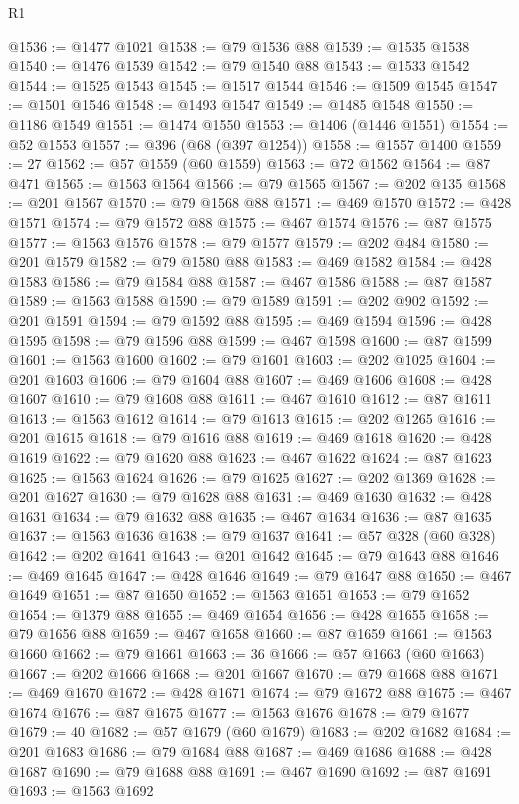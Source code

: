 \begin{lexlean}{R1}
\begin{coremodule}
@1536 := @1477 @1021
@1538 := @79 @1536 @88
@1539 := @1535 @1538
@1540 := @1476 @1539
@1542 := @79 @1540 @88
@1543 := @1533 @1542
@1544 := @1525 @1543
@1545 := @1517 @1544
@1546 := @1509 @1545
@1547 := @1501 @1546
@1548 := @1493 @1547
@1549 := @1485 @1548
@1550 := @1186 @1549
@1551 := @1474 @1550
@1553 := @1406 (@1446 @1551)
@1554 := @52 @1553
@1557 := @396 (@68 (@397 @1254))
@1558 := @1557 @1400
@1559 := 27
@1562 := @57 @1559 (@60 @1559)
@1563 := @72 @1562
@1564 := @87 @471
@1565 := @1563 @1564
@1566 := @79 @1565
@1567 := @202 @135
@1568 := @201 @1567
@1570 := @79 @1568 @88
@1571 := @469 @1570
@1572 := @428 @1571
@1574 := @79 @1572 @88
@1575 := @467 @1574
@1576 := @87 @1575
@1577 := @1563 @1576
@1578 := @79 @1577
@1579 := @202 @484
@1580 := @201 @1579
@1582 := @79 @1580 @88
@1583 := @469 @1582
@1584 := @428 @1583
@1586 := @79 @1584 @88
@1587 := @467 @1586
@1588 := @87 @1587
@1589 := @1563 @1588
@1590 := @79 @1589
@1591 := @202 @902
@1592 := @201 @1591
@1594 := @79 @1592 @88
@1595 := @469 @1594
@1596 := @428 @1595
@1598 := @79 @1596 @88
@1599 := @467 @1598
@1600 := @87 @1599
@1601 := @1563 @1600
@1602 := @79 @1601
@1603 := @202 @1025
@1604 := @201 @1603
@1606 := @79 @1604 @88
@1607 := @469 @1606
@1608 := @428 @1607
@1610 := @79 @1608 @88
@1611 := @467 @1610
@1612 := @87 @1611
@1613 := @1563 @1612
@1614 := @79 @1613
@1615 := @202 @1265
@1616 := @201 @1615
@1618 := @79 @1616 @88
@1619 := @469 @1618
@1620 := @428 @1619
@1622 := @79 @1620 @88
@1623 := @467 @1622
@1624 := @87 @1623
@1625 := @1563 @1624
@1626 := @79 @1625
@1627 := @202 @1369
@1628 := @201 @1627
@1630 := @79 @1628 @88
@1631 := @469 @1630
@1632 := @428 @1631
@1634 := @79 @1632 @88
@1635 := @467 @1634
@1636 := @87 @1635
@1637 := @1563 @1636
@1638 := @79 @1637
@1641 := @57 @328 (@60 @328)
@1642 := @202 @1641
@1643 := @201 @1642
@1645 := @79 @1643 @88
@1646 := @469 @1645
@1647 := @428 @1646
@1649 := @79 @1647 @88
@1650 := @467 @1649
@1651 := @87 @1650
@1652 := @1563 @1651
@1653 := @79 @1652
@1654 := @1379 @88
@1655 := @469 @1654
@1656 := @428 @1655
@1658 := @79 @1656 @88
@1659 := @467 @1658
@1660 := @87 @1659
@1661 := @1563 @1660
@1662 := @79 @1661
@1663 := 36
@1666 := @57 @1663 (@60 @1663)
@1667 := @202 @1666
@1668 := @201 @1667
@1670 := @79 @1668 @88
@1671 := @469 @1670
@1672 := @428 @1671
@1674 := @79 @1672 @88
@1675 := @467 @1674
@1676 := @87 @1675
@1677 := @1563 @1676
@1678 := @79 @1677
@1679 := 40
@1682 := @57 @1679 (@60 @1679)
@1683 := @202 @1682
@1684 := @201 @1683
@1686 := @79 @1684 @88
@1687 := @469 @1686
@1688 := @428 @1687
@1690 := @79 @1688 @88
@1691 := @467 @1690
@1692 := @87 @1691
@1693 := @1563 @1692

\end{coremodule}
\end{lexlean}

